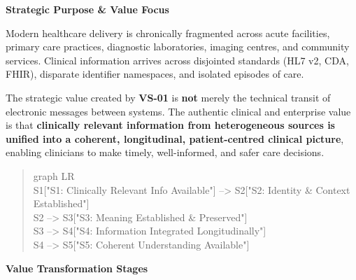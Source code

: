 \par\medskip\textbf{Strategic Purpose \& Value Focus}\par


Modern healthcare delivery is chronically fragmented across acute facilities, primary care practices, diagnostic laboratories, imaging centres, and community services. Clinical information arrives across disjointed standards (HL7 v2, CDA, FHIR), disparate identifier namespaces, and isolated episodes of care.



The strategic value created by \textbf{VS-01} is \textbf{not} merely the technical transit of electronic messages between systems. The authentic clinical and enterprise value is that \textbf{clinically relevant information from heterogeneous sources is unified into a coherent, longitudinal, patient-centred clinical picture}, enabling clinicians to make timely, well-informed, and safer care decisions.



\begin{quote}\small\ttfamily
graph LR\\
    S1["S1: Clinically Relevant Info Available"] --> S2["S2: Identity \& Context Established"]\\
    S2 --> S3["S3: Meaning Established \& Preserved"]\\
    S3 --> S4["S4: Information Integrated Longitudinally"]\\
    S4 --> S5["S5: Coherent Understanding Available"]\\

\end{quote}


\par\medskip\textbf{Value Transformation Stages}\par


